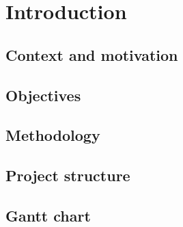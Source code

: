 \chapter{Introduction}\label{ch:introduction}
\section{Context and motivation}

\section{Objectives}

\section{Methodology}

\section{Project structure}

\section{Gantt chart}